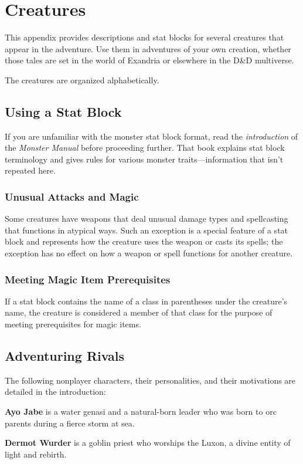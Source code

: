 \documentclass[10pt,a4paper,twoside,bg=print,twocolumn,openany,nodeprecatedcode]{dndbook}
\begin{document}
\appendix
\chapter{Creatures}
This appendix provides descriptions and stat blocks for several creatures that appear in the adventure. Use them in adventures of your own creation, whether those tales are set in the world of Exandria or elsewhere in the D\&D multiverse.

The creatures are organized alphabetically.

\section{Using a Stat Block}
If you are unfamiliar with the monster stat block format, read the \textit{introduction} of the \textit{Monster Manual} before proceeding further. That book explains stat block terminology and gives rules for various monster traits—information that isn't repeated here.

\subsection{Unusual Attacks and Magic}
Some creatures have weapons that deal unusual damage types and spellcasting that functions in atypical ways. Such an exception is a special feature of a stat block and represents how the creature uses the weapon or casts its spells; the exception has no effect on how a weapon or spell functions for another creature.

\subsection{Meeting Magic Item Prerequisites}
If a stat block contains the name of a class in parentheses under the creature's name, the creature is considered a member of that class for the purpose of meeting prerequisites for magic items.

\section{Adventuring Rivals}
The following nonplayer characters, their personalities, and their motivations are detailed in the introduction:

\textbf{Ayo Jabe} is a water genasi and a natural-born leader who was born to orc parents during a fierce storm at sea.

\textbf{Dermot Wurder} is a goblin priest who worships the Luxon, a divine entity of light and rebirth.
\end{document}
